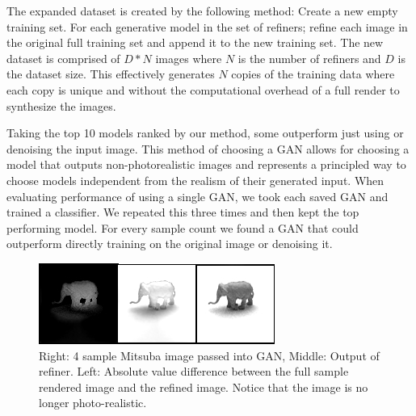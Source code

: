 \documentclass[10pt,twocolumn,letterpaper]{article}
\begin{document}
The expanded dataset is created by the following method: Create a new empty training set. For each generative model in the set of refiners; refine each image in the original full training set and append it to the new training set. The new dataset is comprised of $D * N$ images where $N$ is the number of refiners and $D$ is the dataset size.
This effectively generates $N$ copies of the training data where each copy is unique and without the computational overhead of a full render to synthesize the images.

Taking the top 10 models ranked by our method, some outperform just using or denoising the input image.  This method of choosing a GAN allows for choosing a model that outputs non-photorealistic images and represents a principled way to choose models independent from the realism of their generated input.  When evaluating performance of using a single GAN, we took each saved GAN and trained a classifier.  We repeated this three times and then kept the top performing model. For every sample count we found a GAN that could outperform directly training on the original image or denoising it.


\begin{figure}[h!]
\centering
\includegraphics[width=1.0\columnwidth]{./assets/4sampleGAN-onerow.png}
\caption{Right: 4 sample Mitsuba image passed into GAN, Middle: Output of refiner.  Left: Absolute value difference between the full sample rendered image and the refined image. Notice that the image is no longer photo-realistic.}
\label{fig:GAN_4}
\end{figure}
\end{document}
